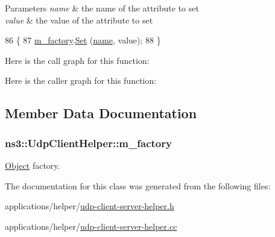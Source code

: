 \begin{DoxyParams}{Parameters}
{\em name} & the name of the attribute to set \\
\hline
{\em value} & the value of the attribute to set \\
\hline
\end{DoxyParams}

\begin{DoxyCode}
86 \{
87   \hyperlink{classns3_1_1UdpClientHelper_ac997ca60646b9887b7e68a6b06997879}{m\_factory}.\hyperlink{classns3_1_1ObjectFactory_aef5c0d5019c96bdf01cefd1ff83f4a68}{Set} (\hyperlink{generate__test__data__lte__spectrum__model_8m_ab74e6bf80237ddc4109968cedc58c151}{name}, value);
88 \}
\end{DoxyCode}


Here is the call graph for this function\+:




Here is the caller graph for this function\+:




\subsection{Member Data Documentation}
\subsubsection[{\texorpdfstring{m\+\_\+factory}{m_factory}}]{ ns3\+::\+Udp\+Client\+Helper\+::m\+\_\+factory\hspace{0.3cm}{\ttfamily [private]}}\hypertarget{classns3_1_1UdpClientHelper_ac997ca60646b9887b7e68a6b06997879}{}\label{classns3_1_1UdpClientHelper_ac997ca60646b9887b7e68a6b06997879}


\hyperlink{classns3_1_1Object}{Object} factory. 



The documentation for this class was generated from the following files\+:\begin{DoxyCompactItemize}
\item 
applications/helper/\hyperlink{udp-client-server-helper_8h}{udp-\/client-\/server-\/helper.\+h}\item 
applications/helper/\hyperlink{udp-client-server-helper_8cc}{udp-\/client-\/server-\/helper.\+cc}\end{DoxyCompactItemize}
